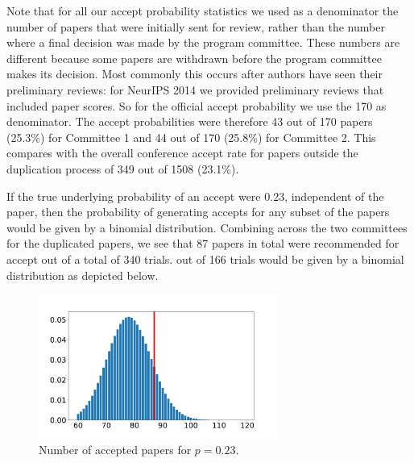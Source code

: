 Note that for all our accept probability statistics we used as a
denominator the number of papers that were initially sent for review,
rather than the number where a final decision was made by the program
committee. These numbers are different because some papers are withdrawn
before the program committee makes its decision. Most commonly this
occurs after authors have seen their preliminary reviews: for NeurIPS 2014
we provided preliminary reviews that included paper scores. So for the
official accept probability we use the 170 as denominator. The accept
probabilities were therefore 43 out of 170 papers (25.3\%) for Committee
1 and 44 out of 170 (25.8\%) for Committee 2. This compares with the
overall conference accept rate for papers outside the duplication
process of 349 out of 1508 (23.1\%).

If the true underlying probability of an accept were 0.23, independent
of the paper, then the probability of generating accepts for any subset
of the papers would be given by a binomial distribution. Combining
across the two committees for the duplicated papers, we see that 87
papers in total were recommended for accept out of a total of 340
trials. out of 166 trials would be given by a binomial distribution as
depicted below.

\begin{Shaded}
\begin{Highlighting}[]
\end{Highlighting}
\end{Shaded}

\begin{figure}[htb]
\includegraphics[width=0.70\textwidth]{diagrams/neurips/uncertainty-accept-rate.pdf}


\caption{Number of accepted papers for $p=0.23$.}
\label{uncertainty-accept-rate}
\end{figure}

